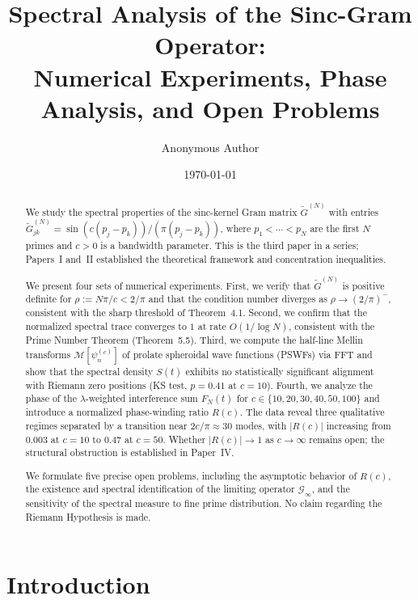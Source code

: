 \documentclass[12pt,a4paper]{amsart}
\title[Sinc-Gram Operator: Experiments and Open Problems]%
{Spectral Analysis of the Sinc-Gram Operator:\\
Numerical Experiments, Phase Analysis, and Open Problems}
\author{Anonymous Author}
\date{\today}
\theoremstyle{definition}
\newcommand{\Gcinf}{\mathcal{G}_\infty}
\begin{document}
\begin{abstract}
We study the spectral properties of the sinc-kernel Gram matrix
$\widetilde{G}^{(N)}$ with entries
$\widetilde{G}^{(N)}_{jk} = \sin(c(p_j-p_k))/(\pi(p_j-p_k))$,
where $p_1 < \cdots < p_N$ are the first $N$ primes and $c > 0$
is a bandwidth parameter. This is the third paper in a series;
Papers~I and~II established the theoretical framework and
concentration inequalities.

We present four sets of numerical experiments.
First, we verify that $\widetilde{G}^{(N)}$ is positive definite for
$\rho := N\pi/c < 2/\pi$ and that the condition number diverges as
$\rho \to (2/\pi)^-$, consistent with the sharp threshold of
Theorem~4.1.
Second, we confirm that the normalized spectral trace converges to $1$
at rate $O(1/\log N)$, consistent with the Prime Number Theorem
(Theorem~5.5).
Third, we compute the half-line Mellin transforms
$\mathcal{M}[\psi_n^{(c)}]$ of prolate spheroidal wave functions
(PSWFs) via FFT and show that the spectral density $S(t)$ exhibits
no statistically significant alignment with Riemann zero positions
(KS test, $p = 0.41$ at $c = 10$).
Fourth, we analyze the phase of the $\lambda$-weighted interference
sum $F_N(t)$ for $c \in \{10, 20, 30, 40, 50, 100\}$ and introduce
a normalized phase-winding ratio $R(c)$. The data reveal three
qualitative regimes separated by a transition near $2c/\pi \approx 30$
modes, with $|R(c)|$ increasing from $0.003$ at $c = 10$ to $0.47$
at $c = 50$. Whether $|R(c)| \to 1$ as $c \to \infty$ remains open;
the structural obstruction is established in Paper~IV.

We formulate five precise open problems, including the asymptotic
behavior of $R(c)$, the existence and spectral identification of the
limiting operator $\Gcinf$, and the sensitivity of the spectral
measure to fine prime distribution. No claim regarding the Riemann
Hypothesis is made.
\end{abstract}

\maketitle
\tableofcontents

\section{Introduction}
\label{sec:intro}
\end{document}

